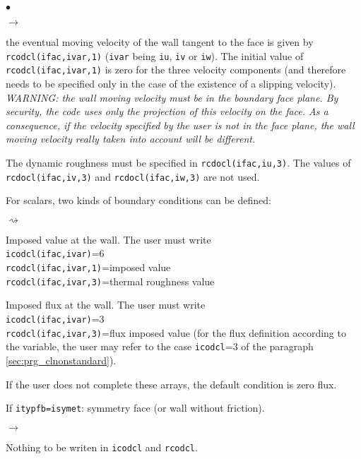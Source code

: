 {{{\begin{list}{$\bullet$}{}
\begin{list}{$\rightarrow$}{}
\item the eventual moving velocity of the wall tangent to the face is
      given by \texttt{rcodcl(ifac,ivar,1)} (\texttt{ivar} being
      \texttt{iu}, \texttt{iv} or \texttt{iw}). The initial
      value of \texttt{rcodcl(ifac,ivar,1)} is zero for
      the three velocity components (and therefore needs to be specified
      only in the case of the existence of a slipping velocity). \\
{\em WARNING: the wall moving velocity must be in the boundary face
      plane. By security, the code uses only the projection of this
      velocity on the face. As a consequence, if the velocity specified
      by the user is not in the face plane, the wall moving velocity really
      taken into account will be different.}
\item The dynamic roughness must be specified in \texttt{rcdocl(ifac,iu,3)}.
      The values of \texttt{rcdocl(ifac,iv,3)} and
      \texttt{rcdocl(ifac,iw,3)} are not used.
\item For scalars, two kinds of boundary conditions can be defined:
\begin{list}{$\rightsquigarrow$}{}
\item Imposed value at the wall. The user must write\\
\hspace*{1cm}\texttt{icodcl(ifac,ivar)}=6\\
\hspace*{1cm}\texttt{rcodcl(ifac,ivar,1)}=imposed value\\
\hspace*{1cm}\texttt{rcodcl(ifac,ivar,3)}=thermal roughness value\\
\item Imposed flux at the wall. The user must write\\
\hspace*{1cm}\texttt{icodcl(ifac,ivar)}=3\\
\hspace*{1cm}\texttt{rcodcl(ifac,ivar,3)}=flux imposed value (for the flux
      definition according to the variable, the user may refer to the
      case \texttt{icodcl}=3 of the paragraph \ref{sec:prg_clnonstandard}).
\item If the user does not complete these arrays, the default condition
      is zero flux.
\end{list}
\end{list}
\item If \texttt{itypfb=isymet}: symmetry face (or wall without friction).
\begin{list}{$\rightarrow$}{}
\item Nothing to be writen in \texttt{icodcl} and  \texttt{rcodcl}.
\end{list}


\end{list}}}}
